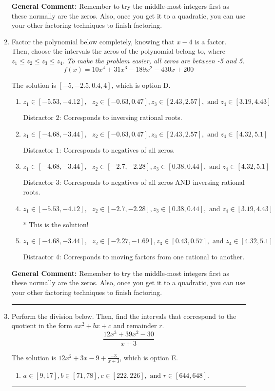 \documentclass{extbook}[14pt]
\newcommand{\litem}[1]{\item #1

\rule{\textwidth}{0.4pt}}
\begin{document}
\begin{enumerate}
{\textbf{General Comment:} Remember to try the middle-most integers first as these normally are the zeros. Also, once you get it to a quadratic, you can use your other factoring techniques to finish factoring.
}
\litem{
Factor the polynomial below completely, knowing that $x-4$ is a factor. Then, choose the intervals the zeros of the polynomial belong to, where $z_1 \leq z_2 \leq z_3 \leq z_4$. \textit{To make the problem easier, all zeros are between -5 and 5.}
\[ f(x) = 10x^{4} +31 x^{3} -189 x^{2} -430 x + 200 \]

The solution is \( [-5, -2.5, 0.4, 4] \), which is option D.\begin{enumerate}[label=\Alph*.]
\item \( z_1 \in [-5.53, -4.12], \text{   }  z_2 \in [-0.63, 0.47], z_3 \in [2.43, 2.57], \text{   and   } z_4 \in [3.19, 4.43] \)

 Distractor 2: Corresponds to inversing rational roots.
\item \( z_1 \in [-4.68, -3.44], \text{   }  z_2 \in [-0.63, 0.47], z_3 \in [2.43, 2.57], \text{   and   } z_4 \in [4.32, 5.1] \)

 Distractor 1: Corresponds to negatives of all zeros.
\item \( z_1 \in [-4.68, -3.44], \text{   }  z_2 \in [-2.7, -2.28], z_3 \in [0.38, 0.44], \text{   and   } z_4 \in [4.32, 5.1] \)

 Distractor 3: Corresponds to negatives of all zeros AND inversing rational roots.
\item \( z_1 \in [-5.53, -4.12], \text{   }  z_2 \in [-2.7, -2.28], z_3 \in [0.38, 0.44], \text{   and   } z_4 \in [3.19, 4.43] \)

* This is the solution!
\item \( z_1 \in [-4.68, -3.44], \text{   }  z_2 \in [-2.27, -1.69], z_3 \in [0.43, 0.57], \text{   and   } z_4 \in [4.32, 5.1] \)

 Distractor 4: Corresponds to moving factors from one rational to another.
\end{enumerate}

\textbf{General Comment:} Remember to try the middle-most integers first as these normally are the zeros. Also, once you get it to a quadratic, you can use your other factoring techniques to finish factoring.
}
\litem{
Perform the division below. Then, find the intervals that correspond to the quotient in the form $ax^2+bx+c$ and remainder $r$.
\[ \frac{12x^{3} +39 x^{2} -30}{x + 3} \]

The solution is \( 12x^{2} +3 x -9 + \frac{-3}{x + 3} \), which is option E.\begin{enumerate}[label=\Alph*.]
\item \( a \in [9, 17], b \in [71, 78], c \in [222, 226], \text{ and } r \in [644, 648]. \)


\end{enumerate}}
\end{enumerate}
\end{document}
